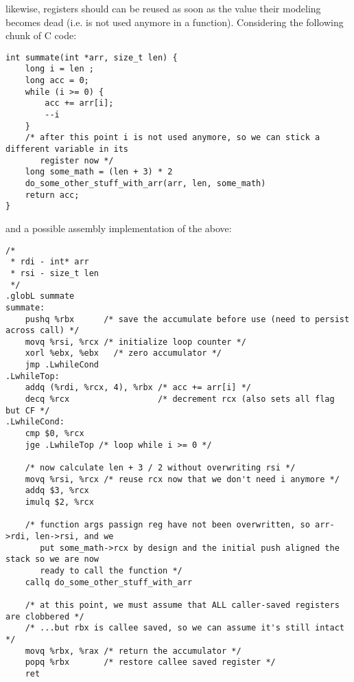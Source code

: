 \documentclass[11pt]{article}
\begin{document}
likewise, registers should can be reused as soon as the value their modeling becomes dead
(i.e. is not used anymore in a function). Considering the following chunk of C code:

\begin{lstlisting}
int summate(int *arr, size_t len) {
    long i = len ;
    long acc = 0;
    while (i >= 0) {
        acc += arr[i];
        --i
    }
    /* after this point i is not used anymore, so we can stick a different variable in its
       register now */
    long some_math = (len + 3) * 2
    do_some_other_stuff_with_arr(arr, len, some_math)
    return acc;
}
\end{lstlisting}

and a possible assembly implementation of the above:

\begin{lstlisting}
/*
 * rdi - int* arr
 * rsi - size_t len
 */
.globL summate
summate:
    pushq %rbx      /* save the accumulate before use (need to persist across call) */
    movq %rsi, %rcx /* initialize loop counter */
    xorl %ebx, %ebx   /* zero accumulator */
    jmp .LwhileCond
.LwhileTop:
    addq (%rdi, %rcx, 4), %rbx /* acc += arr[i] */
    decq %rcx                  /* decrement rcx (also sets all flag but CF */
.LwhileCond:
    cmp $0, %rcx
    jge .LwhileTop /* loop while i >= 0 */

    /* now calculate len + 3 / 2 without overwriting rsi */
    movq %rsi, %rcx /* reuse rcx now that we don't need i anymore */
    addq $3, %rcx
    imulq $2, %rcx

    /* function args passign reg have not been overwritten, so arr->rdi, len->rsi, and we
       put some_math->rcx by design and the initial push aligned the stack so we are now
       ready to call the function */
    callq do_some_other_stuff_with_arr

    /* at this point, we must assume that ALL caller-saved registers are clobbered */
    /* ...but rbx is callee saved, so we can assume it's still intact */
    movq %rbx, %rax /* return the accumulator */
    popq %rbx       /* restore callee saved register */
    ret
\end{lstlisting}
\end{document}

